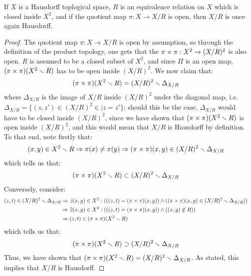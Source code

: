        \begin{lemma} \label{lemma: hausdorff_quotient_criterion}
            If $X$ is a Hausdorff toplogical space, $R$ is an equivalence relation on $X$ which is closed inside $X^2$, and if the quotient map $\pi: X \to X/R$ is open, then $X/R$ is once again Hausdorff.
        \end{lemma}
            \begin{proof}
                The quotient map $\pi: X \to X/R$ is open by assumption, so through the definition of the product topology, one gets that the  $\pi \x \pi: X^2 \to (X/R)^2$ is also open. $R$ is assumed to be a closed subset of $X^2$, and since $\Pi$ is an open map, $(\pi \x \pi)(X^2 \setminus R)$ has to be open inside $(X/R)^2$. We now claim that:
                    $$(\pi \x \pi)(X^2 \setminus R) = (X/R)^2 \setminus \Delta_{X/R}$$
                where $\Delta_{X/R}$ is the image of $X/R$ inside $(X/R)^2$ under the diagonal map, i.e. $\Delta_{X/R} = \{(z, z') \in (X/R)^2 \in \mid z = z'\}$; should this be the case, $\Delta_{X/R}$ would have to be closed inside $(X/R)^2$, since we have shown that $(\pi \x \pi)(X^2 \setminus R)$ is open inside $(X/R)^2$, and this would mean that $X/R$ is Hausdorff by definition. To that end, note firstly that:
                    $$(x, y) \in X^2 \setminus R \implies \pi(x) \not = \pi(y) \implies (\pi \x \pi)(x, y) \in (X/R)^2 \setminus \Delta_{X/R}$$
                which tells us that:
                    $$(\pi \x \pi)(X^2 \setminus R) \subset (X/R)^2 \setminus \Delta_{X/R}$$
                Conversely, consider:
                    $$
                        \begin{aligned}
                            (z, t) \in (X/R)^2 \setminus \Delta_{X/R} & \implies \exists (x, y) \in X^2: ( ((z, t) = (\pi \x \pi)(x, y)) \wedge ((\pi \x \pi)(x, y) \in (X/R)^2 \setminus \Delta_{X/R}) )
                            \\
                            & \implies \exists (x, y) \in X^2: ( ((z, t) = (\pi \x \pi)(x, y)) \wedge ((x, y) \not \in R) )
                            \\
                            & \implies (z, t) \in (\pi \x \pi)(X^2 \setminus R)
                        \end{aligned}
                    $$
                which tells us that:
                    $$(\pi \x \pi)(X^2 \setminus R) \supset (X/R)^2 \setminus \Delta_{X/R}$$
                Thus, we have shown that $(\pi \x \pi)(X^2 \setminus R) = (X/R)^2 \setminus \Delta_{X/R}$. As stated, this implies that $X/R$ is Hausdorff.
            \end{proof}

